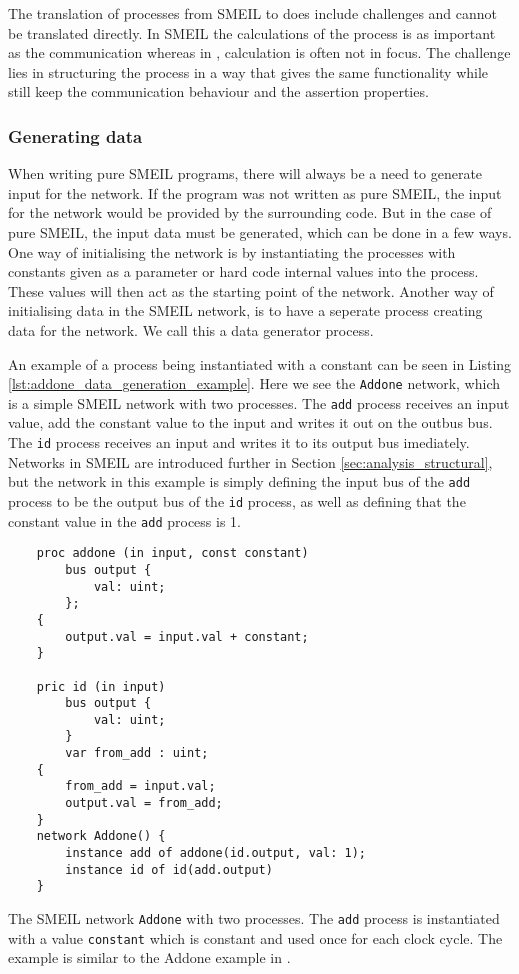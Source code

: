 The translation of processes from SMEIL to \cspm does include challenges and cannot be translated directly. In SMEIL the calculations of the process is as important as the communication whereas in \cspm, calculation is often not in focus. The challenge lies in structuring the \cspm process in a way that gives the same functionality while still keep the \cspm communication behaviour and the assertion properties.

\subsubsection{Generating data}
When writing pure SMEIL programs, there will always be a need to generate input for the network. If the program was not written as pure SMEIL, the input for the network would be provided by the surrounding code. But in the case of pure SMEIL, the input data must be generated, which can be done in a few ways.
One way of initialising the network is by instantiating the processes with constants given as a parameter or hard code internal values into the process. These values will then act as the starting point of the network. Another way of initialising data in the SMEIL network, is to have a seperate process creating data for the network. We call this a data generator process.

An example of a process being instantiated with a constant can be seen in Listing \ref{lst:addone_data_generation_example}. Here we see the \texttt{Addone} network, which is a simple SMEIL network with two processes. The \texttt{add} process receives an input value, add the constant value to the input and writes it out on the outbus bus. The \texttt{id} process receives an input and writes it to its output bus imediately. Networks in SMEIL are introduced further in Section \ref{sec:analysis_structural}, but the network in this example is simply defining the input bus of the \texttt{add} process to be the output bus of the \texttt{id} process, as well as defining that the constant value in the \texttt{add} process is 1.

\begin{listing}
    \begin{verbatim}
    proc addone (in input, const constant)
        bus output {
            val: uint;
        };
    {
        output.val = input.val + constant;
    }

    pric id (in input)
        bus output {
            val: uint;
        }
        var from_add : uint;
    {
        from_add = input.val;
        output.val = from_add;
    }
    network Addone() {
        instance add of addone(id.output, val: 1);
        instance id of id(add.output)
    }
    \end{verbatim}
    \caption{The SMEIL network \texttt{Addone} with two processes. The \texttt{add} process is instantiated with a value \texttt{constant} which is constant and used once for each clock cycle. The example is similar to the Addone example in \cite{smeil}.}
    \label{lst:addone_data_generation_example}
\end{listing}


